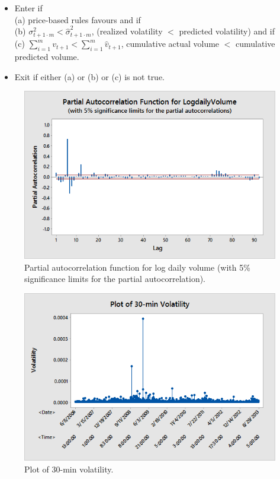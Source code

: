 	\begin{itemize}
	\item Enter if \\
	(a) price-based rules favours and if \\
	(b) $\sigma_{t+1\cdot m}^2< \hat{\sigma}_{t+1\cdot m}^2$, (realized volatility $<$ predicted volatility) and if \\
	(c) $\sum_{i=1}^m v_{t+1} < \sum_{i=1}^m \hat{v}_{t+1}$, cumulative actual volume $<$ cumulative predicted volume. 
	\item Exit if either (a) or (b) or (c) is not true. 
	\end{itemize}
	
        \begin{figure}[!ht]
        \centering
        \includegraphics[width=\textwidth]{chapters/chapter_stat_ts/figures/logdaily.png}
        \caption{Partial autocorrelation function for log daily volume (with 5\% significance limits for the partial autocorrelation). \label{fig:logdailyvolume}}
        \end{figure}
        
        \begin{figure}[!ht]
        \centering
        \includegraphics[width=\textwidth]{chapters/chapter_stat_ts/figures/30min.png}
        \caption{Plot of 30-min volatility. \label{fig:30min}}
        \end{figure}
        
